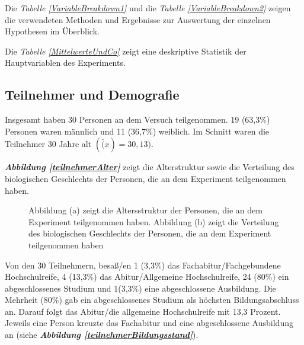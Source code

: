 \documentclass[a4paper,11pt]{article}%
\renewcommand{\\}{\vspace*{0.5\baselineskip} \newline}
\begin{document}
Die \textit{Tabelle \ref{VariableBreakdown1}} und die \textit{Tabelle \ref{VariableBreakdown2}} zeigen die verwendeten Methoden und Ergebnisse zur Auswertung der einzelnen Hypothesen im Überblick.

Die \textit{Tabelle \ref{MittelwerteUndCo}} zeigt eine deskriptive Statistik der Hauptvariablen des Experiments.
	\subsection{Teilnehmer und Demografie}
Insgesamt haben 30 Personen an dem Versuch teilgenommen. 19 (63,3\%) Personen waren männlich und 11 (36,7\%) weiblich. Im Schnitt waren die Teilnehmer 30 Jahre alt $(\bar(x) = 30,13)$.

\textbf{\textit{Abbildung \ref{teilnehmerAlter}}} zeigt die Alterstruktur sowie die Verteilung des biologischen Geschlechts der Personen, die an dem Experiment teilgenommen haben. 

	\begin{figure}[h]
  \centering
  \qquad
  \caption[Altersstruktur und biologisches Geschlecht der Teilnehmer]{Abbildung (a) zeigt die Altersstruktur der Personen, die an dem Experiment teilgenommen haben. Abbildung (b) zeigt die Verteilung des biologischen Geschlechts der Personen, die an dem Experiment teilgenommen haben}
  \label{teilnehmer Alter}
\end{figure}

Von den 30 Teilnehmern, besaß/en 1 (3,3\%) das Fachabitur/Fachgebundene Hochschulreife, 4 (13,3\%) das Abitur/Allgemeine Hochschulreife, 24 (80\%) ein abgeschlossenes Studium und 1(3,3\%) eine abgeschlossene Ausbildung. 
Die Mehrheit (80\%)  gab ein \dq{}abgeschlossenes Studium\dq{} als höchsten Bildungsabschluss an. Darauf folgt \dq{}das Abitur/die allgemeine Hochschulreife\dq{} mit 13,3 Prozent. Jeweils eine Person kreuzte das \dq{}Fachabitur\dq{} und eine \dq{}abgeschlossene Ausbildung\dq{} an (siehe \textbf{\textit{Abbildung \ref{teilnehmerBildungsstand}}}).
\end{document}
